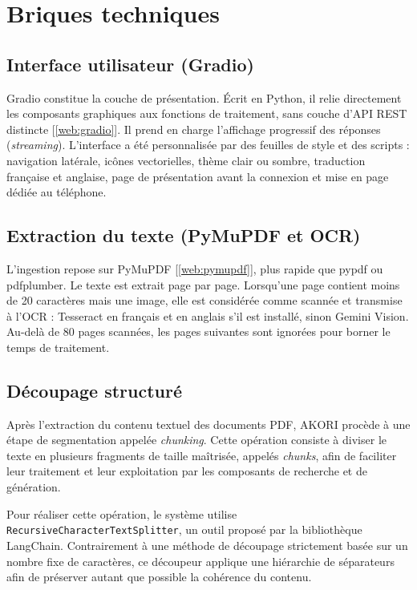 \documentclass[12pt,a4paper,oneside]{report}
\newcommand{\webref}[1]{[\ref{web:#1}]}
\begin{document}
\section{Briques techniques}

\subsection{Interface utilisateur (Gradio)}

Gradio constitue la couche de présentation. Écrit en Python, il relie directement les composants graphiques aux fonctions de traitement, sans couche d'API REST distincte \cite{abid2019gradio}\webref{gradio}. Il prend en charge l'affichage progressif des réponses (\emph{streaming}). L'interface a été personnalisée par des feuilles de style et des scripts : navigation latérale, icônes vectorielles, thème clair ou sombre, traduction française et anglaise, page de présentation avant la connexion et mise en page dédiée au téléphone.

\subsection{Extraction du texte (PyMuPDF et OCR)}

L'ingestion repose sur PyMuPDF \webref{pymupdf}, plus rapide que pypdf ou pdfplumber. Le texte est extrait page par page. Lorsqu'une page contient moins de 20 caractères mais une image, elle est considérée comme scannée et transmise à l'OCR : Tesseract \cite{smith2007tesseract} en français et en anglais s'il est installé, sinon Gemini Vision. Au-delà de 80 pages scannées, les pages suivantes sont ignorées pour borner le temps de traitement.

\subsection{Découpage structuré}

Après l'extraction du contenu textuel des documents PDF, AKORI procède à une étape de segmentation appelée \emph{chunking}. Cette opération consiste à diviser le texte en plusieurs fragments de taille maîtrisée, appelés \emph{chunks}, afin de faciliter leur traitement et leur exploitation par les composants de recherche et de génération.

Pour réaliser cette opération, le système utilise \texttt{RecursiveCharacterTextSplitter}, un outil proposé par la bibliothèque LangChain. Contrairement à une méthode de découpage strictement basée sur un nombre fixe de caractères, ce découpeur applique une hiérarchie de séparateurs afin de préserver autant que possible la cohérence du contenu.
\end{document}
